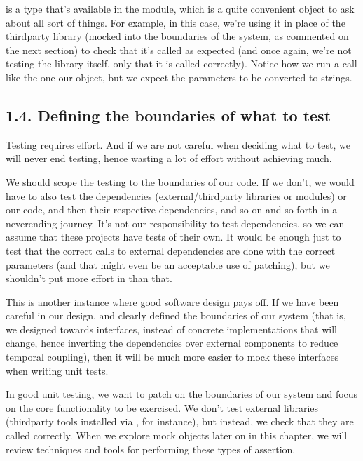 \documentclass[a4paper,10pt,english]{sphinxmanual}
\begin{document}
 is a type that’s available in the  module, which is a quite convenient
object to ask about all sort of things. For example, in this case, we’re using it in place of the
third\sphinxhyphen{}party library (mocked into the boundaries of the system, as commented on the next
section) to check that it’s called as expected (and once again, we’re not testing the library
itself, only that it is called correctly). Notice how we run a call like the one our 
object, but we expect the parameters to be converted to strings.


\subsection{1.4. Defining the boundaries of what to test}
\label{\detokenize{chapters/8_unit_testing/index:defining-the-boundaries-of-what-to-test}}
Testing requires effort. And if we are not careful when deciding what to test, we will never
end testing, hence wasting a lot of effort without achieving much.

We should scope the testing to the boundaries of our code. If we don’t, we would have to
also test the dependencies (external/third\sphinxhyphen{}party libraries or modules) or our code, and then
their respective dependencies, and so on and so forth in a never\sphinxhyphen{}ending journey. It’s not our
responsibility to test dependencies, so we can assume that these projects have tests of their
own. It would be enough just to test that the correct calls to external dependencies are done
with the correct parameters (and that might even be an acceptable use of patching), but we
shouldn’t put more effort in than that.

This is another instance where good software design pays off. If we have been careful in
our design, and clearly defined the boundaries of our system (that is, we designed towards
interfaces, instead of concrete implementations that will change, hence inverting the
dependencies over external components to reduce temporal coupling), then it will be much
more easier to mock these interfaces when writing unit tests.

In good unit testing, we want to patch on the boundaries of our system and focus on the
core functionality to be exercised. We don’t test external libraries (third\sphinxhyphen{}party tools installed
via , for instance), but instead, we check that they are called correctly. When we explore
mock objects later on in this chapter, we will review techniques and tools for performing
these types of assertion.
\end{document}
